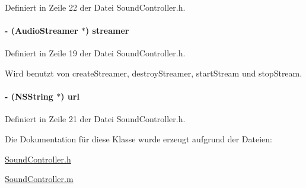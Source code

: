 Definiert in Zeile 22 der Datei SoundController.h.\hypertarget{interface_sound_controller_a87f7a4b2a4565b68491091dd6a4df1be}{
\paragraph[{streamer}]{\setlength{\rightskip}{0pt plus 5cm}-\/ (AudioStreamer $\ast$) streamer}\hfill}
\label{interface_sound_controller_a87f7a4b2a4565b68491091dd6a4df1be}


Definiert in Zeile 19 der Datei SoundController.h.

Wird benutzt von createStreamer, destroyStreamer, startStream und stopStream.\hypertarget{interface_sound_controller_a0cbc2733aa7a4a4d8aa8d41831ecfe75}{
\paragraph[{url}]{\setlength{\rightskip}{0pt plus 5cm}-\/ (NSString $\ast$) url}\hfill}
\label{interface_sound_controller_a0cbc2733aa7a4a4d8aa8d41831ecfe75}


Definiert in Zeile 21 der Datei SoundController.h.

Die Dokumentation für diese Klasse wurde erzeugt aufgrund der Dateien:\begin{DoxyCompactItemize}
\item 
\hyperlink{_sound_controller_8h}{SoundController.h}\item 
\hyperlink{_sound_controller_8m}{SoundController.m}\end{DoxyCompactItemize}
